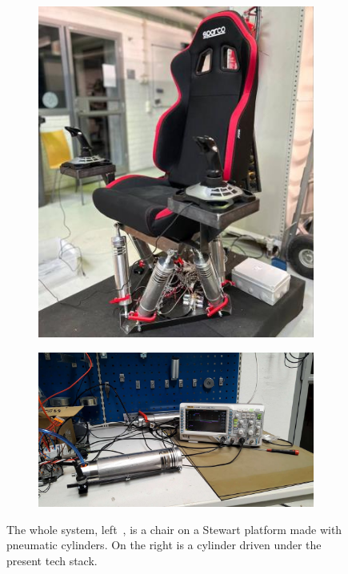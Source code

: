 \documentclass[english,12pt,a4paper,pdftex,eng,utf8]{aaltothesis}
\begin{document}
\begin{figure}[h]
  \centering
  \begin{subfigure}[t]{0.35\textwidth}
    \includegraphics[width=\textwidth]{assets/rocking_chair}
  \end{subfigure}
  \quad
  \begin{subfigure}[t]{0.45\textwidth}
    \includegraphics[width=\textwidth]{assets/pneumatic_cylinder_test}
  \end{subfigure}
  \caption{The whole system, left~\cite{Bjoerklund2023}, is a chair on a Stewart platform made with pneumatic cylinders.  On the right is a cylinder driven under the present tech stack.}\label{fig:stewart_platform_demo}
\end{figure}
\end{document}
